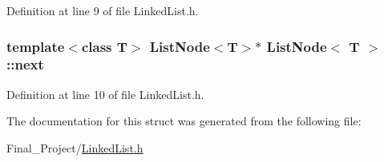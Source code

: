Definition at line 9 of file Linked\-List.\-h.

\hypertarget{structListNode_a97909c9598053ffd24b77ec715f745f1}{
\subsubsection[{next}]{\setlength{\rightskip}{0pt plus 5cm}template$<$class T$>$ {\bf List\-Node}$<$T$>$$\ast$ {\bf List\-Node}$<$ T $>$\-::next}}\label{structListNode_a97909c9598053ffd24b77ec715f745f1}


Definition at line 10 of file Linked\-List.\-h.



The documentation for this struct was generated from the following file\-:\begin{DoxyCompactItemize}
\item 
Final\-\_\-\-Project/\hyperlink{LinkedList_8h}{Linked\-List.\-h}\end{DoxyCompactItemize}
